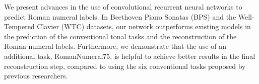 
We present advances in the use of convolutional recurrent
neural networks to predict Roman numeral labels. In
Beethoven Piano Sonatas (BPS) and the Well-Tempered Clavier
(WTC) datasets, our network outperforms existing models in
the prediction of the conventional tonal tasks and the
reconstruction of the Roman numeral labels. Furthermore, we
demonstrate that the use of an additional task,
RomanNumeral75, is helpful to achieve better results in the
final reconstruction step, compared to using the six
conventional tasks proposed by previous researchers.
